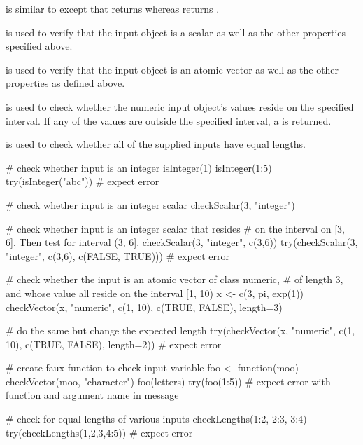 \begin{Details}\relax
{} is similar to  except that  returns  whereas  returns .

 is used to verify that the input object is a scalar as well as the other properties specified above. 

 is used to verify that the input object is an atomic vector as well as the other properties as defined above.

 is used to check whether the numeric input object's values reside on the specified interval. 
If any of the values are outside the specified interval, a  is returned.

 is used to check whether all of the supplied inputs have equal lengths.
\end{Details}
\begin{Examples}
\begin{ExampleCode}
# check whether input is an integer
isInteger(1)
isInteger(1:5)
try(isInteger("abc")) # expect error

# check whether input is an integer scalar
checkScalar(3, "integer")

# check whether input is an integer scalar that resides 
# on the interval on [3, 6]. Then test for interval (3, 6].
checkScalar(3, "integer", c(3,6))
try(checkScalar(3, "integer", c(3,6), c(FALSE, TRUE))) # expect error

# check whether the input is an atomic vector of class numeric,
# of length 3, and whose value all reside on the interval [1, 10)
x <- c(3, pi, exp(1))
checkVector(x, "numeric", c(1, 10), c(TRUE, FALSE), length=3)

# do the same but change the expected length
try(checkVector(x, "numeric", c(1, 10), c(TRUE, FALSE), length=2)) # expect error

# create faux function to check input variable
foo <- function(moo) checkVector(moo, "character")
foo(letters)
try(foo(1:5)) # expect error with function and argument name in message

# check for equal lengths of various inputs
checkLengths(1:2, 2:3, 3:4)
try(checkLengths(1,2,3,4:5)) # expect error
\end{ExampleCode}
\end{Examples}

